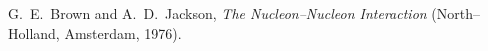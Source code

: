 \documentclass[12pt]{report}
\begin{document}

\begin{thebibliography}{99}


  G.~E.~Brown and A.~D.~Jackson, {\it The
Nucleon--Nucleon Interaction} (North--Holland, Amsterdam, 1976).

\end{thebibliography}


\appendix

\chapter{}



\newpage


\vitapage
\end{document}

